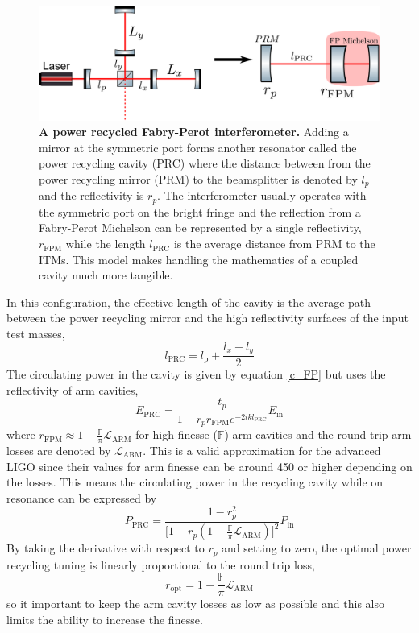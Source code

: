 		\begin{figure}[ht]
			\centering
			\includegraphics[width=1.0 \textwidth]{../Figures/PRC_coupled.png}
			\caption[A power recycled Fabry-Perot interferometer.]
			{\textbf{A power recycled Fabry-Perot interferometer.} 
				Adding a mirror at the symmetric port forms another resonator called the power recycling cavity (PRC) where the distance between from the power recycling mirror (PRM) to the beamsplitter is denoted by $l_p$ and the reflectivity is $r_p$.  The interferometer usually operates with the symmetric port on the bright fringe and the reflection from a Fabry-Perot Michelson can be represented by a single reflectivity, $r_{\text{FPM}}$ while the length $l_{\text{PRC}}$ is the average distance from PRM to the ITMs.   This model makes handling the mathematics of a coupled cavity much more tangible.}
			\label{fig:PRFPMich}
		\end{figure}  
		
		In this configuration, the effective length of the cavity is the average path between the power recycling mirror and the high reflectivity surfaces of the input test masses,
		\begin{equation}
		l_{\text{PRC}} = l_\text{p} + \frac{l_x + l_y}{2}
		\end{equation}
		The circulating power in the cavity is given by equation \ref{c_FP} but uses the reflectivity of arm cavities,
		\begin{equation}
		E_{\text{PRC}} = \frac{t_p}{1- r_p r_{\text{FPM}}   e^{-2ik l_{\text{PRC}}}}E_{\text{in}}
		\end{equation}
		where $r_{\text{FPM}}\approx 1 - \frac{\mathbb{F}}{\pi} \mathcal{L}_{\text{ARM}}$ for high finesse ($\mathbb{F}$) arm cavities and the round trip arm losses are denoted by $\mathcal{L}_{\text{ARM}}$. This is a valid approximation for the advanced LIGO since their values for arm finesse can be around 450 or higher depending on the losses.  This means the circulating power in the recycling cavity while on resonance can be expressed by
		\begin{equation}
		P_{\text{PRC}} = \frac{1-r_p^2}{\bigg[ 1 - r_p  (1 - \frac{\mathbb{F}}{\pi} \mathcal{L}_{\text{ARM}})   \bigg]^2}P_{\text{in}}
		\end{equation} 
		By taking the derivative with respect to $r_p$ and setting to zero, the optimal power recycling tuning is linearly proportional to the round trip loss,
		\begin{equation}
		r_{\text{opt}}  = 1 - \frac{\mathbb{F}}{\pi}\mathcal{L}_{\text{ARM}}
		\end{equation}
		so it important to keep the arm cavity losses as low as possible and this also limits the ability to increase the finesse.
		
